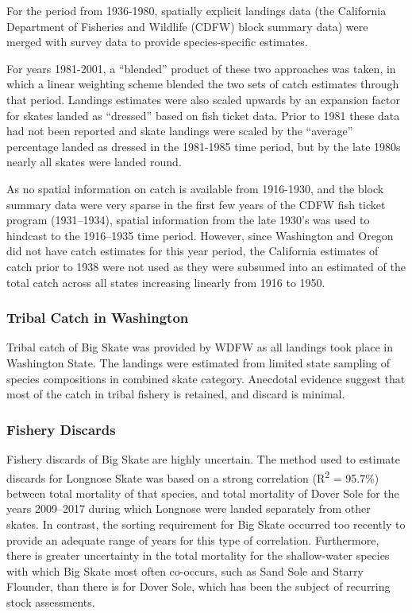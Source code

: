 \documentclass[12pt,]{article}
\begin{document}
For the period from 1936-1980, spatially explicit landings data (the
California Department of Fisheries and Wildlife (CDFW) block summary
data) were merged with survey data to provide species-specific
estimates.

For years 1981-2001, a ``blended'' product of these two approaches was
taken, in which a linear weighting scheme blended the two sets of catch
estimates through that period. Landings estimates were also scaled
upwards by an expansion factor for skates landed as ``dressed'' based on
fish ticket data. Prior to 1981 these data had not been reported and
skate landings were scaled by the ``average'' percentage landed as
dressed in the 1981-1985 time period, but by the late 1980s nearly all
skates were landed round.

As no spatial information on catch is available from 1916-1930, and the
block summary data were very sparse in the first few years of the CDFW
fish ticket program (1931--1934), spatial information from the late
1930's was used to hindcast to the 1916--1935 time period. However,
since Washington and Oregon did not have catch estimates for this year
period, the California estimates of catch prior to 1938 were not used as
they were subsumed into an estimated of the total catch across all
states increasing linearly from 1916 to 1950.

\hypertarget{tribal-catch-in-washington}{%
\subsubsection{Tribal Catch in
Washington}\label{tribal-catch-in-washington}}

Tribal catch of Big Skate was provided by WDFW as all landings took
place in Washington State. The landings were estimated from limited
state sampling of species compositions in combined skate category.
Anecdotal evidence suggest that most of the catch in tribal fishery is
retained, and discard is minimal.

\hypertarget{fishery-discards}{%
\subsubsection{Fishery Discards}\label{fishery-discards}}

Fishery discards of Big Skate are highly uncertain. The method used to
estimate discards for Longnose Skate was based on a strong correlation
(R\textsuperscript{2} = 95.7\%) between total mortality of that species,
and total mortality of Dover Sole for the years 2009--2017 during which
Longnose were landed separately from other skates. In contrast, the
sorting requirement for Big Skate occurred too recently to provide an
adequate range of years for this type of correlation. Furthermore, there
is greater uncertainty in the total mortality for the shallow-water
species with which Big Skate most often co-occurs, such as Sand Sole and
Starry Flounder, than there is for Dover Sole, which has been the
subject of recurring stock assessments.
\end{document}
